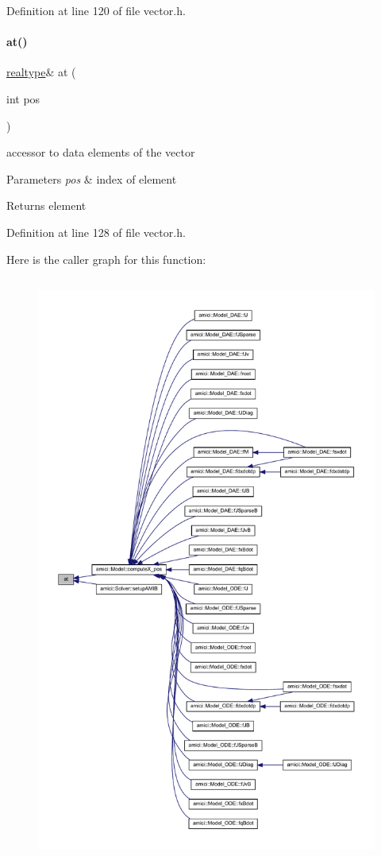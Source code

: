 Definition at line 120 of file vector.\+h.

\mbox{\label{classamici_1_1_ami_vector_ae62cf934983479ccb255785bdf455a2c}} 
\paragraph{\texorpdfstring{at()}{at()}}
{\footnotesize\ttfamily \mbox{\hyperlink{namespaceamici_a1bdce28051d6a53868f7ccbf5f2c14a3}{realtype}}\& at (\begin{DoxyParamCaption}\item[{int}]{pos }\end{DoxyParamCaption})}

accessor to data elements of the vector 
\begin{DoxyParams}{Parameters}
{\em pos} & index of element \\
\hline
\end{DoxyParams}
\begin{DoxyReturn}{Returns}
element 
\end{DoxyReturn}


Definition at line 128 of file vector.\+h.

Here is the caller graph for this function\+:
\nopagebreak
\begin{figure}[H]
\begin{center}
\leavevmode
\includegraphics[height=550pt]{classamici_1_1_ami_vector_ae62cf934983479ccb255785bdf455a2c_icgraph}
\end{center}
\end{figure}
